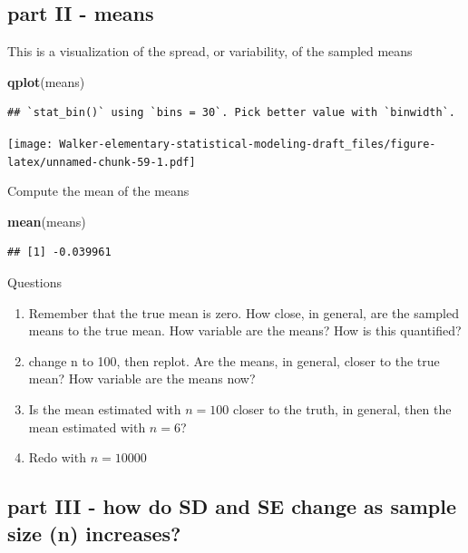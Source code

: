\documentclass[]{book}
\newenvironment{Shaded}{\begin{snugshade}}{\end{snugshade}}
\newcommand{\KeywordTok}[1]{\textcolor[rgb]{0.13,0.29,0.53}{\textbf{#1}}}
\newcommand{\NormalTok}[1]{#1}
\providecommand{\tightlist}{%
  \setlength{\itemsep}{0pt}\setlength{\parskip}{0pt}}
\begin{document}
\hypertarget{part-ii---means}{%
\subsection{part II - means}\label{part-ii---means}}

This is a visualization of the spread, or variability, of the sampled means

\begin{Shaded}
\begin{Highlighting}[]
\KeywordTok{qplot}\NormalTok{(means)}
\end{Highlighting}
\end{Shaded}

\begin{verbatim}
## `stat_bin()` using `bins = 30`. Pick better value with `binwidth`.
\end{verbatim}

\texttt{[image: Walker-elementary-statistical-modeling-draft\_files/figure-latex/unnamed-chunk-59-1.pdf]}

Compute the mean of the means

\begin{Shaded}
\begin{Highlighting}[]
\KeywordTok{mean}\NormalTok{(means)}
\end{Highlighting}
\end{Shaded}

\begin{verbatim}
## [1] -0.039961
\end{verbatim}

Questions

\begin{enumerate}
\def\labelenumi{\arabic{enumi}.}
\tightlist
\item
  Remember that the true mean is zero. How close, in general, are the sampled means to the true mean. How variable are the means? How is this quantified?
\item
  change n to 100, then replot. Are the means, in general, closer to the true mean? How variable are the means now?
\item
  Is the mean estimated with \(n=100\) closer to the truth, in general, then the mean estimated with \(n=6\)?
\item
  Redo with \(n=10000\)
\end{enumerate}

\hypertarget{part-iii---how-do-sd-and-se-change-as-sample-size-n-increases}{%
\subsection{part III - how do SD and SE change as sample size (n) increases?}\label{part-iii---how-do-sd-and-se-change-as-sample-size-n-increases}}
\end{document}
